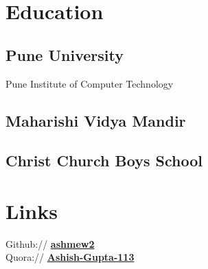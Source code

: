 \documentclass[letterpaper]{deedy-resume} %
\begin{document}
\begin{minipage}[t]{0.33\textwidth} %


\section{Education} 

\subsection{Pune University}

Pune Institute of Computer Technology \\

\sectionspace %


\subsection{Maharishi Vidya Mandir}


\sectionspace %

\subsection{Christ Church Boys School}


\sectionspace %



\section{Links} 

Github:// \href{https://github.com/ashmew2}{\bf ashmew2} \\
Quora:// \href{http://www.quora.com/Ashish-Gupta-113}{\bf Ashish-Gupta-113}

\sectionspace %


\end{minipage}
\end{document}
